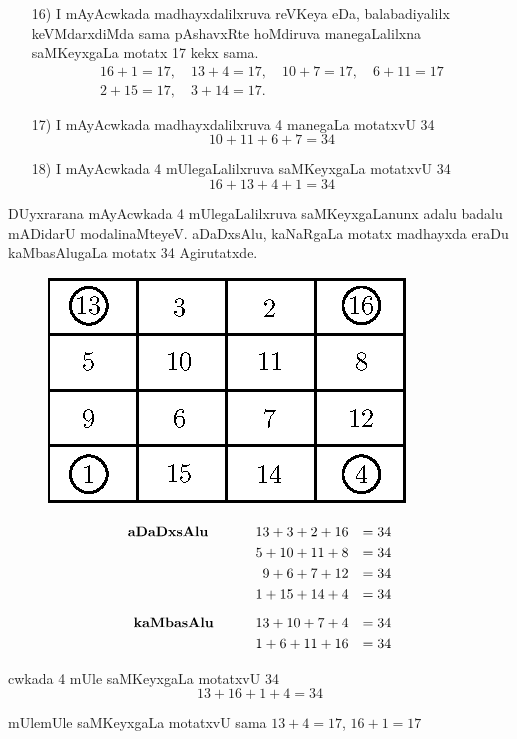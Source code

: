 \begin{enumerate}
\item[{\rm 16)}] I mAyAcwkada madhayxdalilxruva reVKeya eDa, balabadiyalilx keVMdarxdiMda sama pAshavxRte hoMdiruva manegaLalilxna saMKeyxgaLa motatx {\rm 17} kekx sama.
\begin{gather*}
16+1=17, \quad 13+4=17, \quad 10+7=17, \quad 6+11=17 \\
2+15=17, \quad 3+14=17.
\end{gather*}
 
\item[{\rm 17)}] I mAyAcwkada madhayxdalilxruva {\rm 4} manegaLa motatxvU {\rm 34}
$$
10+11+6+7=34
$$

\item[{\rm 18)}] I mAyAcwkada {\rm 4} mUlegaLalilxruva saMKeyxgaLa motatxvU {\rm 34}
$$
16+13+4+1=34
$$
\end{enumerate}

DUyxrarana mAyAcwkada {\rm 4} mUlegaLalilxruva saMKeyxgaLanunx adalu badalu mADidarU modalinaMteyeV. aDaDxsAlu, kaNaRgaLa motatx madhayxda eraDu kaMbasAlugaLa motatx {\rm 34} Agirutatxde.
\begin{figure}[H]
\centering
\includegraphics[scale=.8]{src/figures/m_123.eps}
\end{figure}


\begin{alignat*}{3}
\text{\bf aDaDxsAlu }\qquad  && 13+3+2+16&&=34\\
&&5+10+11+8&&=34\\
&&9+6+7+12&&=34\\
&&1+15+14+4&&=34\\[0.2cm]
\text{\bf kaMbasAlu} \qquad  &&13+10+7+4 &&=34\\
&&1+6+11+16&&=34
\end{alignat*}

cwkada {\rm 4} mUle saMKeyxgaLa motatxvU {\rm 34}
$$
13+16+1+4=34
$$

mUlemUle saMKeyxgaLa motatxvU sama $13+4=17$, \quad $16+1=17$

